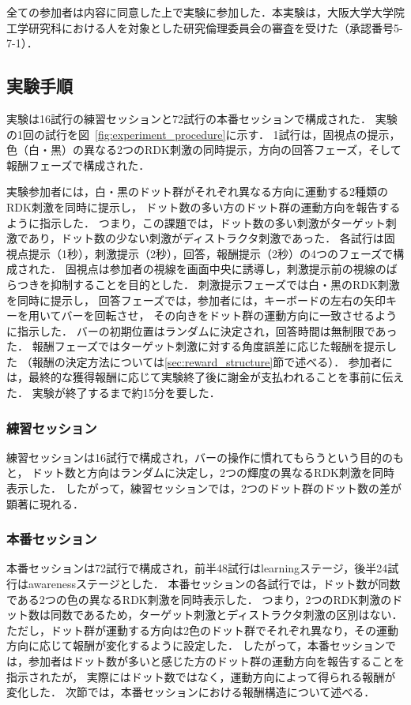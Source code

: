 全ての参加者は内容に同意した上で実験に参加した．本実験は，大阪大学大学院工学研究科における人を対象とした研究倫理委員会の審査を受けた（承認番号5-7-1）．

\subsection{実験手順}
実験は16試行の練習セッションと72試行の本番セッションで構成された．
実験の1回の試行を図~\ref{fig:experiment_procedure}に示す．
1試行は，固視点の提示，色（白・黒）の異なる2つのRDK刺激の同時提示，方向の回答フェーズ，そして報酬フェーズで構成された．

実験参加者には，白・黒のドット群がそれぞれ異なる方向に運動する2種類のRDK刺激を同時に提示し，
ドット数の多い方のドット群の運動方向を報告するように指示した．
つまり，この課題では，ドット数の多い刺激がターゲット刺激であり，ドット数の少ない刺激がディストラクタ刺激であった．
各試行は固視点提示（1秒），刺激提示（2秒），回答，報酬提示（2秒）の4つのフェーズで構成された．
固視点は参加者の視線を画面中央に誘導し，刺激提示前の視線のばらつきを抑制することを目的とした．
刺激提示フェーズでは白・黒のRDK刺激を同時に提示し，
回答フェーズでは，参加者には，キーボードの左右の矢印キーを用いてバーを回転させ，
その向きをドット群の運動方向に一致させるように指示した．
バーの初期位置はランダムに決定され，回答時間は無制限であった．
報酬フェーズではターゲット刺激に対する角度誤差に応じた報酬を提示した
（報酬の決定方法については\ref{sec:reward_structure}節で述べる）．
参加者には，最終的な獲得報酬に応じて実験終了後に謝金が支払われることを事前に伝えた．
実験が終了するまで約15分を要した．

\subsubsection{練習セッション}
練習セッションは16試行で構成され，バーの操作に慣れてもらうという目的のもと，
ドット数と方向はランダムに決定し，2つの輝度の異なるRDK刺激を同時表示した．
したがって，練習セッションでは，2つのドット群のドット数の差が顕著に現れる．

\subsubsection{本番セッション}
本番セッションは72試行で構成され，前半48試行はlearningステージ，後半24試行はawarenessステージとした．
本番セッションの各試行では，ドット数が同数である2つの色の異なるRDK刺激を同時表示した．
つまり，2つのRDK刺激のドット数は同数であるため，ターゲット刺激とディストラクタ刺激の区別はない．
ただし，ドット群が運動する方向は2色のドット群でそれぞれ異なり，その運動方向に応じて報酬が変化するように設定した．
したがって，本番セッションでは，参加者はドット数が多いと感じた方のドット群の運動方向を報告することを指示されたが，
実際にはドット数ではなく，運動方向によって得られる報酬が変化した．
次節では，本番セッションにおける報酬構造について述べる．

